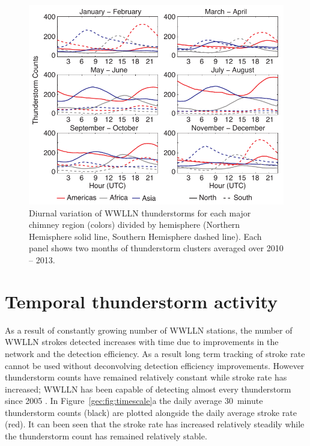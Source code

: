 \begin{figure}[ht!]
    \centering
    \includegraphics[scale=1]{GEC/Figures/bimonthly.pdf}
    \caption{Diurnal variation of WWLLN thunderstorms for each major chimney region (colors) divided by hemisphere (Northern Hemisphere solid line, Southern Hemisphere dashed line).
    		Each panel shows two months of thunderstorm clusters averaged over 2010 -- 2013.
		 }
    \label{gec:fig:bimonthly}
 \end{figure}

\section{Temporal thunderstorm activity}

As a result of constantly growing number of WWLLN stations, the number of WWLLN strokes detected increases with time due to improvements in the network and the detection efficiency.
As a result long term tracking of stroke rate  cannot be used without deconvolving detection efficiency improvements.
However thunderstorm counts have remained relatively constant while stroke rate has increased; WWLLN has been capable of detecting almost every thunderstorm since 2005 \citep{Jacobson2006c}.
In Figure~\ref{gec:fig:timescale}a the daily average 30~minute thunderstorm counts (black) are plotted alongside the daily average stroke rate (red).
It can been seen that the stroke rate has increased relatively steadily while the thunderstorm count has remained relatively stable.

